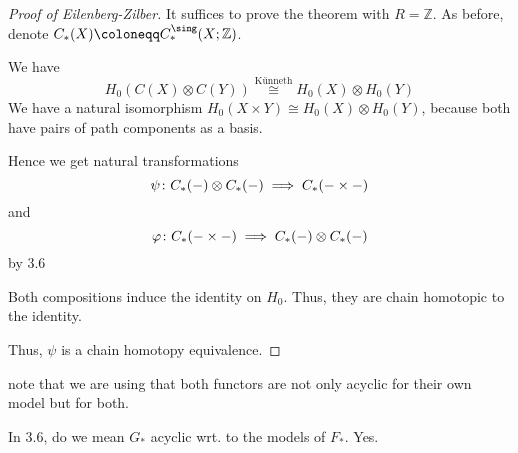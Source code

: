 \begin{proof}[Proof of Eilenberg-Zilber]
  It suffices to prove the theorem with $R = \mathbb{Z}$.
  As before, denote $C_*(X) \coloneqq C_*^{\sing}(X ; \mathbb{Z})$.

  We have
  \[
    H_0(C(X) \otimes C(Y))
    \stackrel{\text{Künneth}}{\cong}
    H_0(X) \otimes H_0(Y)
  \]
  We have a natural isomorphism
  $H_0(X \times Y) \cong H_0(X) \otimes H_0(Y)$,
  because both have pairs of path components as a basis.

  Hence we get natural transformations
  \[
    \psi \colon  C_*(-) \otimes C_*(-) \implies C_*( - \times  - )
  \]
  and
  \[
  \varphi  \colon  C_*( - \times  - ) \implies C_* ( - ) \otimes  C_* ( - )
  \]
  by 3.6

  Both compositions induce the identity on $H_0$.
  Thus, they are chain homotopic to the identity.

  Thus, $\psi $ is a chain homotopy equivalence.
\end{proof}

\begin{oral}
  note that we are using that both functors are not
  only acyclic for their own model but for both.
\end{oral}

\begin{question}
  In 3.6, do we mean $G_*$ acyclic wrt. to the models of  $F_*$.
  Yes.
\end{question}

